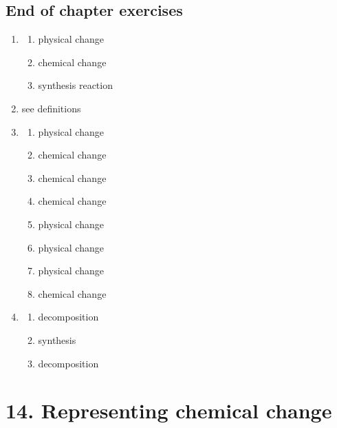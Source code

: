 \subsection{End of chapter exercises}
\begin{multicols}{3}
 \begin{enumerate}[noitemsep, label=\textbf{(\arabic*)} ]
  \item 
 \begin{enumerate}[noitemsep, label=\textbf{(\alph*)} ]
\item physical change
\item chemical change
\item synthesis reaction
\end{enumerate}
\item see definitions
\item 
 \begin{enumerate}[noitemsep, label=\textbf{(\alph*)} ]
\item physical change
\item chemical change
\item chemical change
\item chemical change
\item physical change
\item physical change
\item physical change
\item chemical change
\end{enumerate}
\item
 \begin{enumerate}[noitemsep, label=\textbf{(\alph*)} ]
\item decomposition
\item synthesis
\item decomposition
\end{enumerate}
 \end{enumerate}
\end{multicols}

\section{14. Representing chemical change}
